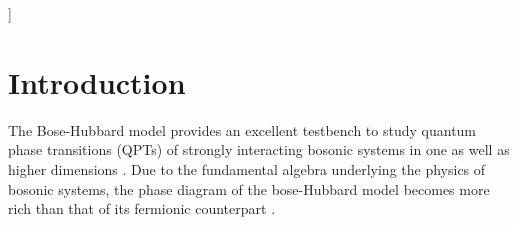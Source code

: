 \documentclass[twoside,twocolumn,9pt]{article}
\begin{document}
  ]

\renewcommand*\rmdefault{bch}\normalfont\upshape
\rmfamily
\section*{}
\vspace{-1cm}










\section{Introduction}

The Bose-Hubbard model provides an excellent testbench to study quantum phase transitions (QPTs) \cite{sachdev1999} of strongly interacting bosonic systems in one \cite{kuhner1998} as well as higher dimensions \cite{freericks1994}. Due to the fundamental algebra underlying the physics of bosonic systems, the phase diagram of the bose-Hubbard model becomes more rich than that of its fermionic counterpart \cite{gu2004, deng2006, cozzini2007, chung2021, devriendt2022}. 
\end{document}
